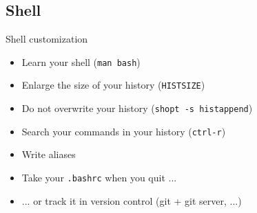 \subsection{Shell}

\begin{frame}[fragile]{Shell customization}
\begin{itemize}
  \pause \item Learn your shell (\texttt{man bash})
  \pause \item Enlarge the size of your history (\texttt{HISTSIZE})
  \pause \item Do not overwrite your history (\texttt{shopt -s histappend})
  \pause \item Search your commands in your history (\texttt{ctrl-r})
  \pause \item Write aliases
  \pause \item Take your \texttt{.bashrc} when you quit ...
  \pause \item ... or track it in version control (git + git server, ...)
\end{itemize}
\end{frame}
